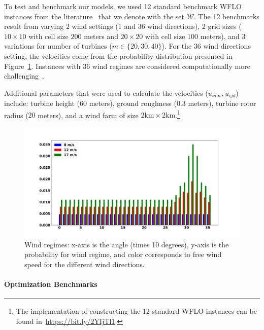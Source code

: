 \documentclass[preprint,12pt]{elsarticle}
\begin{document}
To test and benchmark our models, we used 12 standard benchmark WFLO instances
from the literature~\cite{MOSETTI1994105,Zhang2014,grady2005placement} that we denote with the set $\mathcal{W}$. 
The 12 benchmarks result from varying 2 wind settings (1 and 36 wind directions),
2 grid sizes ($10\times10$ with cell size $200$ meters and $20\times20$ with cell size $100$ meters),
and 3 variations for number of turbines ($m \in \{20, 30, 40\}$). 
For the $36$ wind directions setting, the velocities come from the probability distribution presented in Figure~\ref{fig:prob_wind}.
Instances with $36$ wind regimes are considered computationally more challenging~\cite{Zhang2014}.

Additional parameters that were used to calculate 
the velocities ($u_{id\infty}, u_{ijd}$) include: turbine height ($60$ meters),
ground roughness ($0.3$ meters), turbine rotor radius ($20$ meters), and a wind farm of size $2 \mbox{km} \times 2 \mbox{km}$.\footnote{The implementation of constructing the 12 standard WFLO instances can be found in~\url{https://bit.ly/2YIjTl1}.}


\begin{figure}[t]
	\centering
	\includegraphics[scale = 0.3]{prob_wind_pdf.pdf}
	
	\caption{Wind regimes: x-axis is the angle (times 10 degrees), y-axis is the probability for wind regime, and color corresponds to free wind speed for the different wind directions.}\label{fig:prob_wind}
\end{figure}

\paragraph{Optimization Benchmarks}
\end{document}
